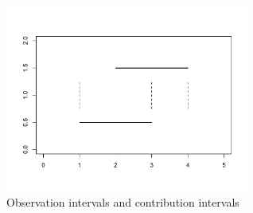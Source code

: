 \begin{figure}[h]
\centerline{\includegraphics[width = 8cm]{ContrbInt.pdf} }
\caption{Observation intervals and contribution intervals}
\label{figure:ObsInt}
\end{figure}	

